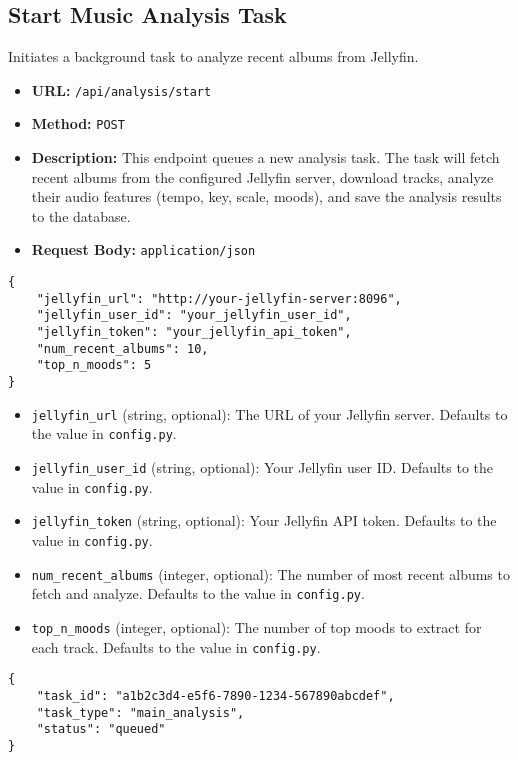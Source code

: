 \documentclass{article}
\begin{document}
\subsection{Start Music Analysis Task}
Initiates a background task to analyze recent albums from Jellyfin.
\begin{itemize}[noitemsep]
    \item \textbf{URL:} \verb|/api/analysis/start|
    \item \textbf{Method:} \texttt{POST}
    \item \textbf{Description:} This endpoint queues a new analysis task. The task will fetch recent albums from the configured Jellyfin server, download tracks, analyze their audio features (tempo, key, scale, moods), and save the analysis results to the database.
    \item \textbf{Request Body:} \texttt{application/json}
\end{itemize}

\lstset{language=json, caption=Example Request Body: Start Music Analysis Task}
\begin{lstlisting}
{
    "jellyfin_url": "http://your-jellyfin-server:8096",
    "jellyfin_user_id": "your_jellyfin_user_id",
    "jellyfin_token": "your_jellyfin_api_token",
    "num_recent_albums": 10,
    "top_n_moods": 5
}
\end{lstlisting}
\begin{itemize}[noitemsep]
    \item \texttt{jellyfin\_url} (string, optional): The URL of your Jellyfin server. Defaults to the value in \texttt{config.py}.
    \item \texttt{jellyfin\_user\_id} (string, optional): Your Jellyfin user ID. Defaults to the value in \texttt{config.py}.
    \item \texttt{jellyfin\_token} (string, optional): Your Jellyfin API token. Defaults to the value in \texttt{config.py}.
    \item \texttt{num\_recent\_albums} (integer, optional): The number of most recent albums to fetch and analyze. Defaults to the value in \texttt{config.py}.
    \item \texttt{top\_n\_moods} (integer, optional): The number of top moods to extract for each track. Defaults to the value in \texttt{config.py}.
\end{itemize}

\lstset{language=json, caption=Example Response: Start Music Analysis Task}
\begin{lstlisting}
{
    "task_id": "a1b2c3d4-e5f6-7890-1234-567890abcdef",
    "task_type": "main_analysis",
    "status": "queued"
}
\end{lstlisting}
\end{document}
